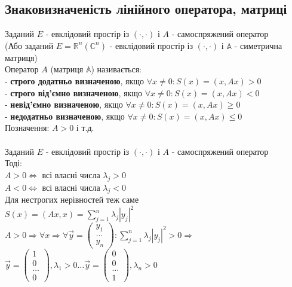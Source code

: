 \documentclass[a4paper, 10pt]{article}
\theoremstyle{theoremdd}
\begin{document}
\subsection{Знаковизначеність лінійного оператора, матриці}
Заданий $E$ - евклідовий простір із $(\cdot,\cdot)$ і $A$ - самоспряжений оператор\\
(Або заданий $E = \mathbb{R}^n (\mathbb{C}^n)$ - евклідовий простір із $(\cdot,\cdot)$ і $\mathbb{A}$ - симетрична матриця)\\
 Оператор $A$ (матриця $\mathbb{A}$) називається:\\
- \textbf{строго додатньо визначеною}, якщо $\forall x \neq 0: S(x) = (x,Ax) > 0$\\
- \textbf{строго від'ємно визначеною}, якщо $\forall x \neq 0: S(x) = (x,Ax) < 0$\\
- \textbf{невід'ємно визначеною}, якщо $\forall x \neq 0: S(x) = (x,Ax) \geq 0$\\
- \textbf{недодатньо визначеною}, якщо $\forall x \neq 0: S(x) = (x,Ax) \leq 0$\\
Позначення: $A > 0$ і т.д.
\bigskip \\
\\
Заданий $E$ - евклідовий простір із $(\cdot,\cdot)$ і $A$ - самоспряжений оператор\\
Тоді:\\
$A > 0 \iff$ всі власні числа $\lambda_j > 0$\\
$A < 0 \iff$ всі власні числа $\lambda_j < 0$\\
Для нестрогих нерівностей теж саме\\
\proof
$S(x) = (Ax,x) = \displaystyle \sum_{j=1}^n \lambda_j |y_j|^2$\\
$A > 0 \Rightarrow \forall x \Rightarrow \forall \vec{y} = \begin{pmatrix}
y_1 \\ \dots \\ y_n
\end{pmatrix}: \displaystyle \sum_{j=1}^n \lambda_j |y_j|^2 > 0 \Rightarrow$\\
$\vec{y} = \begin{pmatrix}
1 \\ 0 \\ \dots \\ 0
\end{pmatrix}, \lambda_1 > 0 \dots \vec{y} = \begin{pmatrix}
0 \\ 0 \\ \dots \\ 1
\end{pmatrix}, \lambda_n > 0$\\
\end{document}
